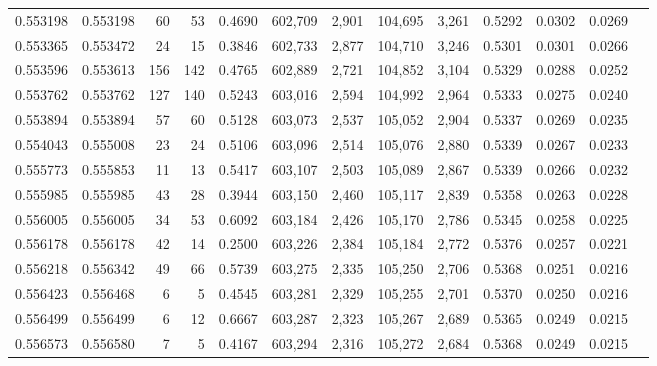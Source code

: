 \begin{tabular}{rrrrrrrrrrrrr}
0.553198 & 0.553198 &    60 &    53 &                                     0.4690 & 602,709 &   2,901 & 104,695 &   3,261 & 0.5292 & 0.0302 & 0.0269 \\
0.553365 & 0.553472 &    24 &    15 &                                     0.3846 & 602,733 &   2,877 & 104,710 &   3,246 & 0.5301 & 0.0301 & 0.0266 \\
0.553596 & 0.553613 &   156 &   142 &                                     0.4765 & 602,889 &   2,721 & 104,852 &   3,104 & 0.5329 & 0.0288 & 0.0252 \\
0.553762 & 0.553762 &   127 &   140 &                                     0.5243 & 603,016 &   2,594 & 104,992 &   2,964 & 0.5333 & 0.0275 & 0.0240 \\
0.553894 & 0.553894 &    57 &    60 &                                     0.5128 & 603,073 &   2,537 & 105,052 &   2,904 & 0.5337 & 0.0269 & 0.0235 \\
0.554043 & 0.555008 &    23 &    24 &                                     0.5106 & 603,096 &   2,514 & 105,076 &   2,880 & 0.5339 & 0.0267 & 0.0233 \\
0.555773 & 0.555853 &    11 &    13 &                                     0.5417 & 603,107 &   2,503 & 105,089 &   2,867 & 0.5339 & 0.0266 & 0.0232 \\
0.555985 & 0.555985 &    43 &    28 &                                     0.3944 & 603,150 &   2,460 & 105,117 &   2,839 & 0.5358 & 0.0263 & 0.0228 \\
0.556005 & 0.556005 &    34 &    53 &                                     0.6092 & 603,184 &   2,426 & 105,170 &   2,786 & 0.5345 & 0.0258 & 0.0225 \\
0.556178 & 0.556178 &    42 &    14 &                                     0.2500 & 603,226 &   2,384 & 105,184 &   2,772 & 0.5376 & 0.0257 & 0.0221 \\
0.556218 & 0.556342 &    49 &    66 &                                     0.5739 & 603,275 &   2,335 & 105,250 &   2,706 & 0.5368 & 0.0251 & 0.0216 \\
0.556423 & 0.556468 &     6 &     5 &                                     0.4545 & 603,281 &   2,329 & 105,255 &   2,701 & 0.5370 & 0.0250 & 0.0216 \\
0.556499 & 0.556499 &     6 &    12 &                                     0.6667 & 603,287 &   2,323 & 105,267 &   2,689 & 0.5365 & 0.0249 & 0.0215 \\
0.556573 & 0.556580 &     7 &     5 &                                     0.4167 & 603,294 &   2,316 & 105,272 &   2,684 & 0.5368 & 0.0249 & 0.0215 \\

\end{tabular}
